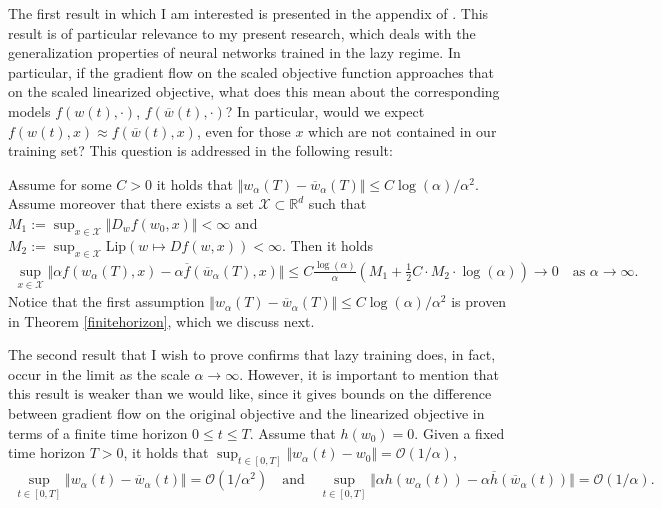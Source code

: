 \documentclass{article}
\newenvironment{manualtheorem}[1]{%
  \renewcommand\themanualtheoreminner{#1}%
  \manualtheoreminner
}{\endmanualtheoreminner}
\newenvironment{manualproposition}[1]{%
  \renewcommand\themanualpropositioninner{#1}%
  \manualpropositioninner
}{\endmanualtheoreminner}
\begin{document}
The first result in which I am interested is presented in the appendix of \cite{chizat2018lazy}. This result is of particular relevance to my present research, which deals with the generalization properties of neural networks trained in the lazy regime. In particular, if the gradient flow on the scaled objective function approaches that on the scaled linearized objective, what does this mean about the corresponding models $f(w(t), \cdot)$, $f(\overline{w}(t), \cdot)$? In particular, would we expect $f(w(t), x) \approx f(\overline{w}(t), x)$, even for those $x$ which are not contained in our training set? This question is addressed in the following result:
\begin{manualproposition}{A.1}
Assume for some $C > 0$ it holds that $\Vert w_{\alpha}(T) - \overline{w}_{\alpha}(T) \Vert \leq C\log(\alpha)/\alpha^2$. Assume moreover that there exists a set $\mathcal{X} \subset \mathbb{R}^d$ such that $M_1 := \sup_{x \in \mathcal{X}} \Vert D_wf(w_0, x) \Vert < \infty$ and $M_2 := \sup_{x \in \mathcal{X}} \text{Lip}(w \mapsto Df(w, x)) < \infty$. Then it holds 
\begin{align*}
    \sup_{x \in \mathcal{X}} \Vert \alpha f(w_{\alpha}(T), x) - \alpha \overline{f}(\overline{w}_{\alpha}(T), x) \Vert \leq C \frac{\log(\alpha)}{\alpha}\left(M_1 + \frac{1}{2}C\cdot M_2 \cdot \log(\alpha) \right) \longrightarrow 0 \quad \text{as $\alpha \longrightarrow \infty$}.
\end{align*}
\end{manualproposition}
Notice that the first assumption $\Vert w_{\alpha}(T) - \overline{w}_{\alpha}(T) \Vert \leq C\log(\alpha)/\alpha^2$ is proven in Theorem \ref{finitehorizon}, which we discuss next.

The second result that I wish to prove confirms that lazy training does, in fact, occur in the limit as the scale $\alpha \rightarrow \infty$. However, it is important to mention that this result is weaker than we would like, since it gives bounds on the difference between gradient flow on the original objective and the linearized objective in terms of a finite time horizon $0 \leq t \leq T$.
\begin{manualtheorem}{2.2}\label{finitehorizon}
Assume that $h(w_0) = 0$. Given a fixed time horizon $T > 0$, it holds that $\sup_{t \in [0, T]} \Vert w_{\alpha}(t) - w_0 \Vert = \mathcal{O}(1/\alpha)$,
\begin{align*}
    \sup_{t \in [0, T]} \Vert w_{\alpha}(t) - \overline{w}_{\alpha}(t) \Vert = \mathcal{O}(1/\alpha^2) \quad \text{and} \quad \sup_{t \in [0, T]} \Vert \alpha h(w_{\alpha}(t)) - \alpha \overline{h}(\overline{w}_{\alpha}(t)) \Vert = \mathcal{O}(1/\alpha).
\end{align*}
\end{manualtheorem}
\end{document}
